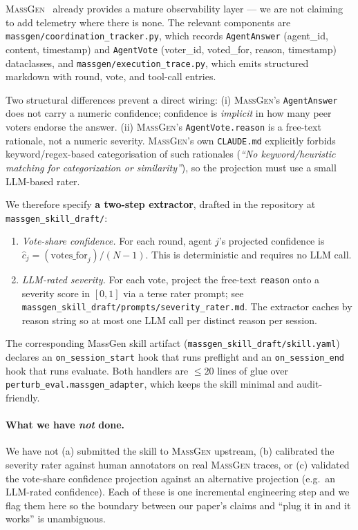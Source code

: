 \documentclass[10pt,a4paper]{article}
\begin{document}
\textsc{MassGen}~\citep{massgen2025github} already provides a mature
observability layer --- we are not claiming to add telemetry where there
is none. The relevant components are
\texttt{massgen/coordination\_tracker.py}, which records
\texttt{AgentAnswer} (agent\_id, content, timestamp) and \texttt{AgentVote}
(voter\_id, voted\_for, reason, timestamp) dataclasses, and
\texttt{massgen/execution\_trace.py}, which emits structured markdown with
round, vote, and tool-call entries.

Two structural differences prevent a direct wiring:
(i) \textsc{MassGen}'s \texttt{AgentAnswer} does not carry a numeric
confidence; confidence is \emph{implicit} in how many peer voters endorse
the answer.
(ii) \textsc{MassGen}'s \texttt{AgentVote.reason} is a free-text rationale,
not a numeric severity.
\textsc{MassGen}'s own \texttt{CLAUDE.md} explicitly forbids
keyword/regex-based categorisation of such rationales (\emph{``No
keyword/heuristic matching for categorization or similarity''}), so the
projection must use a small LLM-based rater.

We therefore specify \textbf{a two-step extractor}, drafted in the
repository at \texttt{massgen\_skill\_draft/}:
\begin{enumerate}[leftmargin=*,topsep=0pt,itemsep=1pt]
  \item \emph{Vote-share confidence.} For each round, agent $j$'s projected
        confidence is $\hat{c}_j = (\mathrm{votes\_for}_j)/(N{-}1)$. This
        is deterministic and requires no LLM call.
  \item \emph{LLM-rated severity.} For each vote, project the free-text
        \texttt{reason} onto a severity score in $[0,1]$ via a terse rater
        prompt; see \texttt{massgen\_skill\_draft/prompts/severity\_rater.md}.
        The extractor caches by reason string so at most one LLM call per
        distinct reason per session.
\end{enumerate}

The corresponding MassGen skill artifact
(\texttt{massgen\_skill\_draft/skill.yaml}) declares an
\texttt{on\_session\_start} hook that runs preflight and an
\texttt{on\_session\_end} hook that runs evaluate. Both handlers are
$\leq 20$ lines of glue over \texttt{perturb\_eval.massgen\_adapter}, which
keeps the skill minimal and audit-friendly.

\paragraph{What we have \emph{not} done.} We have not (a) submitted the
skill to \textsc{MassGen} upstream, (b) calibrated the severity rater
against human annotators on real \textsc{MassGen} traces, or (c) validated
the vote-share confidence projection against an alternative projection
(e.g.\ an LLM-rated confidence). Each of these is one incremental
engineering step and we flag them here so the boundary between our paper's
claims and ``plug it in and it works'' is unambiguous.
\end{document}
